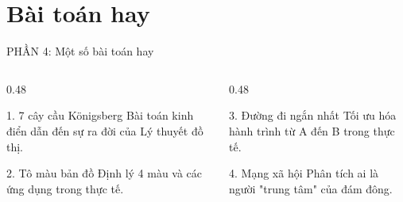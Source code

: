 \documentclass[11pt]{beamer}
\author[Lê Viết Phúc]{Lê Viết Phúc}
\newenvironment{mainbox}[1]{\begin{block}{#1}}{\end{block}}
\begin{document}
\section{Bài toán hay}

\begin{frame}{ PHẦN 4: Một số bài toán hay }
    \begin{center}
    \end{center}
    \vspace{0.3cm}
    \begin{columns}[T]
        \begin{column}{0.48\textwidth}
            \begin{mainbox}{1. 7 cây cầu Königsberg}
                Bài toán kinh điển dẫn đến sự ra đời của Lý thuyết đồ thị.
            \end{mainbox}
            \vspace{0.2cm}
            \begin{mainbox}{2. Tô màu bản đồ}
                Định lý 4 màu và các ứng dụng trong thực tế.
            \end{mainbox}
        \end{column}
        \begin{column}{0.48\textwidth}
            \begin{mainbox}{3. Đường đi ngắn nhất}
                Tối ưu hóa hành trình từ A đến B trong thực tế.
            \end{mainbox}
            \vspace{0.2cm}
            \begin{mainbox}{4. Mạng xã hội}
                Phân tích ai là người "trung tâm" của đám đông.
            \end{mainbox}
        \end{column}
    \end{columns}
\end{frame}
\end{document}
